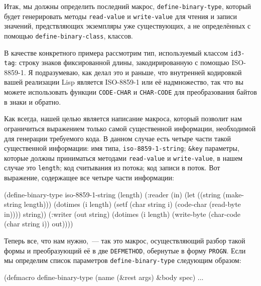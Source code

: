 Итак, мы должны определить последний макрос, \lstinline{define-binary-type}, который будет
генерировать методы \lstinline{read-value} и \lstinline{write-value} для чтения и записи значений,
предствляющих экземпляры уже существующих, а не определённых с помощью
\lstinline{define-binary-class}, классов.

В качестве конкретного примера рассмотрим тип, используемый классом \lstinline{id3-tag}: строку
знаков фиксированной длины, закодирированную с помощью ISO-8859-1. Я подразумеваю, как
делал это и раньше, что внутренней кодировкой вашей реализации Lisp является ISO-8859-1
или её надмножество, так что вы можете использовать функции \lstinline{CODE-CHAR} и
\lstinline{CHAR-CODE} для преобразования байтов в знаки и обратно.

Как всегда, нашей целью является написание макроса, который позволит нам ограничиться
выражением только самой существенной информации, необходимой для генерации требуемого
кода. В данном случае есть четыре части такой существенной информации: имя типа,
\lstinline{iso-8859-1-string}; \lstinline!&key! параметры, которые должны приниматься методами
\lstinline{read-value} и \lstinline{write-value}, в нашем случае это \lstinline{length}; код считывания
из потока; код записи в поток. Вот выражение, содержащее все четыре части информации:

\begin{myverb}
(define-binary-type iso-8859-1-string (length)
  (:reader (in)
    (let ((string (make-string length)))
      (dotimes (i length)
        (setf (char string i) (code-char (read-byte in))))
      string))
  (:writer (out string)
    (dotimes (i length)
      (write-byte (char-code (char string i)) out))))
\end{myverb}

Теперь все, что нам нужно,~--- так это макрос, осуществляющий разбор такой формы и
преобразующий её в две \lstinline{DEFMETHOD}, обернутые в форму \lstinline{PROGN}. Если мы
определим список параметров \lstinline{define-binary-type} следующим образом:

\begin{myverb}
(defmacro define-binary-type (name (&rest args) &body spec) ...
\end{myverb}

